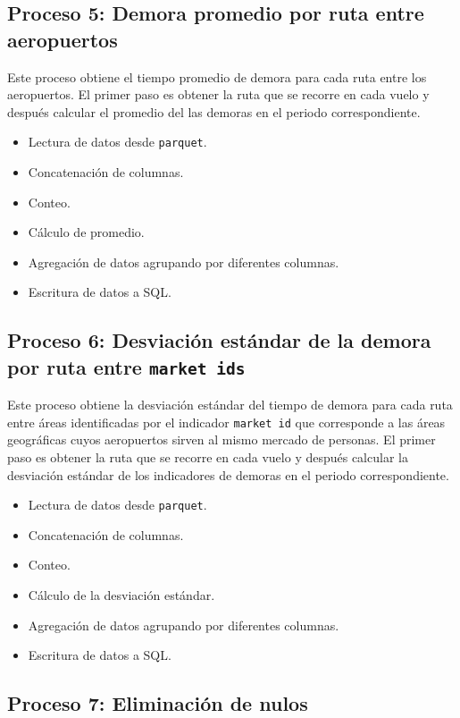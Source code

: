 \subsection{Proceso 5: Demora promedio por ruta entre aeropuertos}

Este proceso obtiene el tiempo promedio de demora para cada ruta entre los aeropuertos. El primer paso es obtener la ruta que se recorre en cada vuelo y después calcular el promedio del las demoras en el periodo correspondiente.

\begin{itemize}
	\item Lectura de datos desde \texttt{parquet}.
	\item Concatenación de columnas.
	\item Conteo.
	\item Cálculo de promedio.
	\item Agregación de datos agrupando por diferentes columnas.
	\item Escritura de datos a SQL.
\end{itemize}

\subsection{Proceso 6: Desviación estándar de la demora por ruta entre \texttt{market ids}}

Este proceso obtiene la desviación estándar del tiempo de demora para cada ruta entre áreas identificadas por el indicador \texttt{market id} que corresponde a las áreas geográficas cuyos aeropuertos sirven al mismo mercado de personas. El primer paso es obtener la ruta que se recorre en cada vuelo y después calcular la desviación estándar de los indicadores de demoras en el periodo correspondiente.

\begin{itemize}
	\item Lectura de datos desde \texttt{parquet}.
	\item Concatenación de columnas.
	\item Conteo.
	\item Cálculo de la desviación estándar.
	\item Agregación de datos agrupando por diferentes columnas.
	\item Escritura de datos a SQL.
\end{itemize}

\subsection{Proceso 7: Eliminación de nulos}


